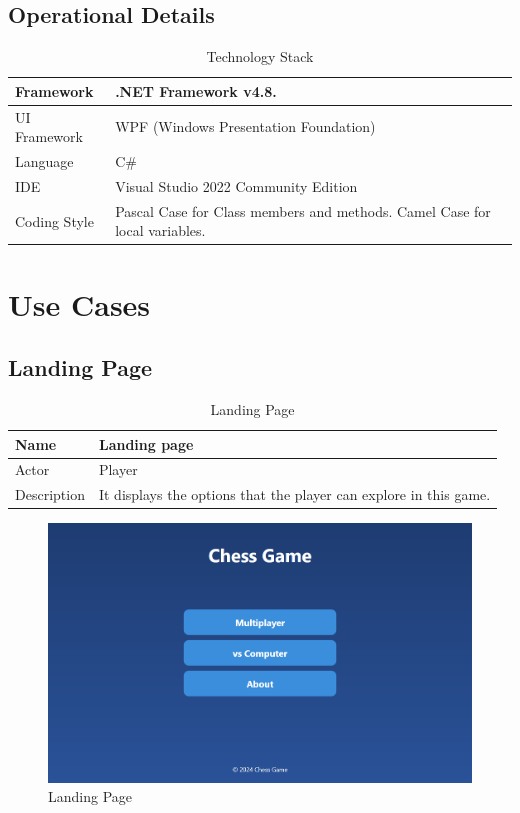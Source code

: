\documentclass[a4paper,12pt]{article}
\begin{document}
\subsection{Operational Details}
\begin{longtable}{|p{}|p{}|}
    \caption{Technology Stack}
    \hline
    Framework & .NET Framework v4.8. \\
    \hline
    UI Framework & WPF (Windows Presentation Foundation)   \\
    \hline
    Language & C\# \\
    \hline
    IDE & Visual Studio 2022 Community Edition \\
    \hline
    Coding Style & Pascal Case for Class members and methods. Camel Case for local variables. \\
    \hline
\end{longtable}

\section{Use Cases}

\subsection{Landing Page}

\begin{longtable}{|m{}|m{}|}
    \caption{Landing Page} \\
    \hline
    Name & Landing page \\
    \hline
    Actor & Player \\
    \hline
    Description & It displays the options that the player can explore in this game. \\ 
    \hline
\end{longtable}

\begin{figure}[H]
    \centering
    \includegraphics[width=0.7\linewidth]{Images/Use Cases/landingPage.png}
    \caption{Landing Page}
    \label{fig:landingPage}
\end{figure}
    
\end{document}
